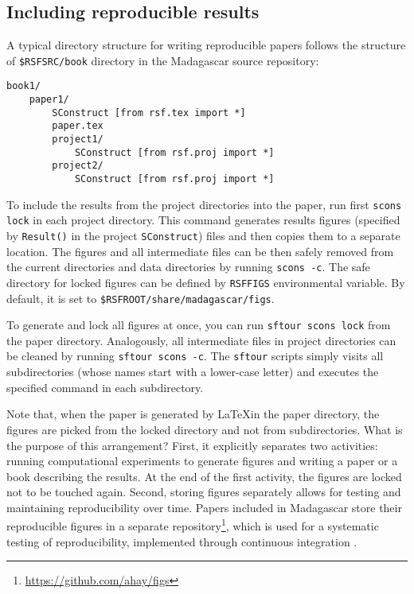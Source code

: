 {{\subsection{Including reproducible results}

A typical directory structure for writing reproducible papers follows the structure of \texttt{\$RSFSRC/book} directory in the Madagascar source repository:
\begin{verbatim}
book1/
    paper1/
        SConstruct [from rsf.tex import *]
        paper.tex
        project1/
            SConstruct [from rsf.proj import *]
        project2/
            SConstruct [from rsf.proj import *]
\end{verbatim}

To include the results from the project directories into the paper,
run first \texttt{scons lock} in each project directory. This command
generates results figures (specified by \texttt{Result()} in the
project \texttt{SConstruct}) files and then copies them to a separate
location. The figures and all intermediate files can be then safely
removed from the current directories and data directories by running
\texttt{scons -c}. The safe directory for locked figures can be
defined by \texttt{RSFFIGS} environmental variable. By default, it is
set to \texttt{\$RSFROOT/share/madagascar/figs}.

To generate and lock all figures at once, you can run \texttt{sftour
  scons lock} from the paper directory. Analogously, all intermediate
files in project directories can be cleaned by running \texttt{sftour
  scons -c}. The \texttt{sftour} scripts simply visits all
subdirectories (whose names start with a lower-case letter) and
executes the specified command in each subdirectory.
  
Note that, when the paper is generated by \LaTeX in the paper
directory, the figures are picked from the locked directory and not
from subdirectories. What is the purpose of this arrangement? First,
it explicitly separates two activities: running computational
experiments to generate figures and writing a paper or a book
describing the results. At the end of the first activity, the figures
are locked not to be touched again. Second, storing figures separately
allows for testing and maintaining reproducibility over time. Papers
included in Madagascar store their reproducible figures in a separate
repository\footnote{\url{https://github.com/ahay/figs}}, which is used
for a systematic testing of reproducibility, implemented through
continuous integration \cite[]{duvall2007continuous}.

}}
